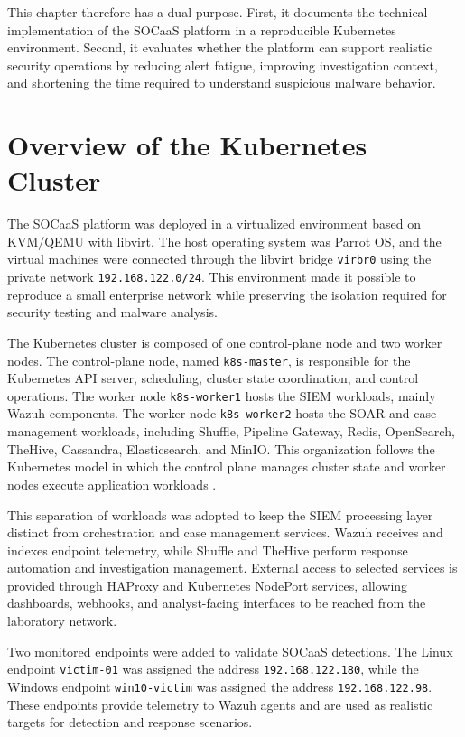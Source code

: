 This chapter therefore has a dual purpose. First, it documents the technical implementation of the SOCaaS platform in a reproducible Kubernetes environment. Second, it evaluates whether the platform can support realistic security operations by reducing alert fatigue, improving investigation context, and shortening the time required to understand suspicious malware behavior.

\section{Overview of the Kubernetes Cluster}
\label{sec:ch4-cluster-overview}

The SOCaaS platform was deployed in a virtualized environment based on KVM/QEMU with libvirt. The host operating system was Parrot OS, and the virtual machines were connected through the libvirt bridge \texttt{virbr0} using the private network \texttt{192.168.122.0/24}. This environment made it possible to reproduce a small enterprise network while preserving the isolation required for security testing and malware analysis.

The Kubernetes cluster is composed of one control-plane node and two worker nodes. The control-plane node, named \texttt{k8s-master}, is responsible for the Kubernetes API server, scheduling, cluster state coordination, and control operations. The worker node \texttt{k8s-worker1} hosts the SIEM workloads, mainly Wazuh components. The worker node \texttt{k8s-worker2} hosts the SOAR and case management workloads, including Shuffle, Pipeline Gateway, Redis, OpenSearch, TheHive, Cassandra, Elasticsearch, and MinIO. This organization follows the Kubernetes model in which the control plane manages cluster state and worker nodes execute application workloads \cite{k8s-docs,luksa2017kubernetes}.

This separation of workloads was adopted to keep the SIEM processing layer distinct from orchestration and case management services. Wazuh receives and indexes endpoint telemetry, while Shuffle and TheHive perform response automation and investigation management. External access to selected services is provided through HAProxy and Kubernetes NodePort services, allowing dashboards, webhooks, and analyst-facing interfaces to be reached from the laboratory network.

Two monitored endpoints were added to validate SOCaaS detections. The Linux endpoint \texttt{victim-01} was assigned the address \texttt{192.168.122.180}, while the Windows endpoint \texttt{win10-victim} was assigned the address \texttt{192.168.122.98}. These endpoints provide telemetry to Wazuh agents and are used as realistic targets for detection and response scenarios.

